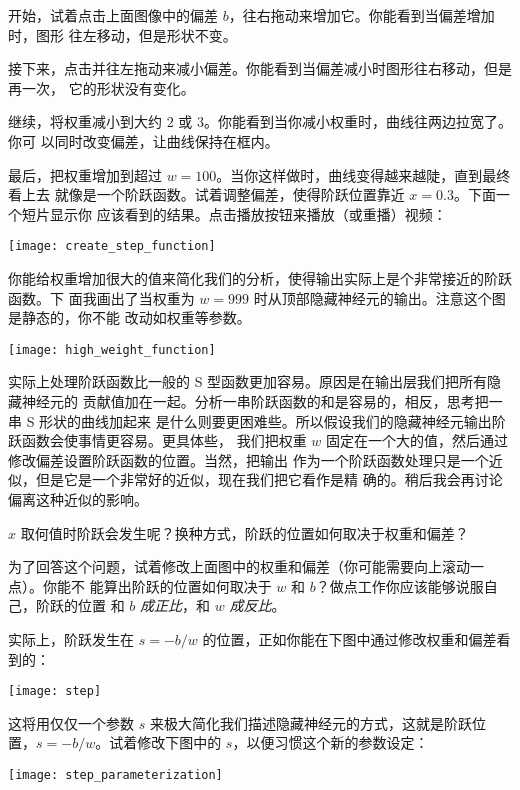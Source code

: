 开始，试着点击上面图像中的偏差 $b$，往右拖动来增加它。你能看到当偏差增加时，图形
往左移动，但是形状不变。

接下来，点击并往左拖动来减小偏差。你能看到当偏差减小时图形往右移动，但是再一次，
它的形状没有变化。

继续，将权重减小到大约 $2$ 或 $3$。你能看到当你减小权重时，曲线往两边拉宽了。你可
以同时改变偏差，让曲线保持在框内。

最后，把权重增加到超过 $w = 100$。当你这样做时，曲线变得越来越陡，直到最终看上去
就像是一个阶跃函数。试着调整偏差，使得阶跃位置靠近 $x = 0.3$。下面一个短片显示你
应该看到的结果。点击播放按钮来播放（或重播）视频：
\begin{center}
  \texttt{[image: create\_step\_function]}
\end{center}


你能给权重增加很大的值来简化我们的分析，使得输出实际上是个非常接近的阶跃函数。下
面我画出了当权重为 $w = 999$ 时从顶部隐藏神经元的输出。注意这个图是静态的，你不能
改动如权重等参数。
\begin{center}
  \texttt{[image: high\_weight\_function]}
\end{center}

实际上处理阶跃函数比一般的 S 型函数更加容易。原因是在输出层我们把所有隐藏神经元的
贡献值加在一起。分析一串阶跃函数的和是容易的，相反，思考把一串 S 形状的曲线加起来
是什么则要更困难些。所以假设我们的隐藏神经元输出阶跃函数会使事情更容易。更具体些，
我们把权重 $w$ 固定在一个大的值，然后通过修改偏差设置阶跃函数的位置。当然，把输出
作为一个阶跃函数处理只是一个近似，但是它是一个非常好的近似，现在我们把它看作是精
确的。稍后我会再讨论偏离这种近似的影响。

$x$ 取何值时阶跃会发生呢？换种方式，阶跃的位置如何取决于权重和偏差？

为了回答这个问题，试着修改上面图中的权重和偏差（你可能需要向上滚动一点）。你能不
能算出阶跃的位置如何取决于 $w$ 和 $b$？做点工作你应该能够说服自己，阶跃的位置
和 $b$ \emph{成正比}，和 $w$ \emph{成反比}。

实际上，阶跃发生在 $s = -b/w$ 的位置，正如你能在下图中通过修改权重和偏差看到的：
\begin{center}
  \texttt{[image: step]}
\end{center}

这将用仅仅一个参数 $s$ 来极大简化我们描述隐藏神经元的方式，这就是阶跃位置，$s =
-b/w$。试着修改下图中的 $s$，以便习惯这个新的参数设定：
\begin{center}
  \texttt{[image: step\_parameterization]}
\end{center}

